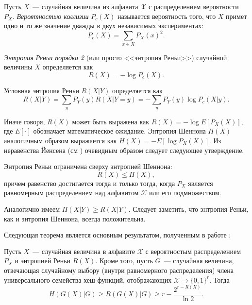 \begin{definition}
  Пусть $X$~--- случайная величина из алфавита $\mathcal{X}$ с распределением вероятности $P_X$. \textit{Вероятностью коллизии} $P_c(X)$ называется вероятность того, что $X$ примет одно и то же значение дважды в двух независимых экспериментах:
  \begin{equation}
    P_c(X) = \sum_{x\in X} P_X(x)^2.
  \end{equation}
\end{definition}

\begin{definition}
  \textit{Энтропия Реньи порядка 2} (или просто <<энтропия Реньи>>) случайной величины $X$ определяется как 
  \begin{equation}
    R(X) = -\log P_c(X).
  \end{equation}
\end{definition}

\begin{definition}
  Условная энтропия Реньи $R(X|Y)$ определяется как
  \begin{equation}
    R(X|Y) = \sum_y P_Y(y) R(X|Y=y) = -\sum_y P_Y(y) \log P_c(X|y).
  \end{equation}
\end{definition}

Иначе говоря, $R(X)$ может быть выражена как $R(X) = -\log E[P_X(X)]$, где $E[\cdot]$ обозначает математическое ожидание. Энтропия Шеннона $H(X)$ аналогичным образом выражается как $H(X) = -E[\log P_X(X)]$. Из неравенства Йенсена (см \cite{jensens_inequality}) очевидным образом следует следующее утверждение.

\begin{statement}
  Энтропия Реньи ограничена сверху энтропией Шеннона:
  $$ R(X) \leq H(X), $$
  причем равенство достигается тогда и только тогда, когда $P_X$ является равномерным распределением над алфавитом $\mathcal{X}$ или его подмножеством.
\end{statement}

Аналогично имеем $H(X|Y) \geq R(X|Y)$. Следует заметить, что энтропия Реньи, как и энтропия Шеннона, всегда положительна.

Следующая теорема является основным результатом, полученным в работе \cite{privacy_amplification}:

\begin{theorem}
  Пусть $X$~--- случайная величина в алфавите $\mathcal{X}$ с вероятностым распределением $P_X$ и энтропией Реньи $R(X)$. Кроме того, пусть $G$~--- случайная величина, отвечающая случайному выбору (внутри равномерного распределения) члена универсального семейства хеш-функций, отображающих $\mathcal{X} \rightarrow \{0,1\}^r$. Тогда
  \begin{equation}
    H(G(X)|G) \geq R(G(X)|G) \geq r - \frac{2^{r - R(X)}}{\ln 2}.
  \end{equation}
\end{theorem}

